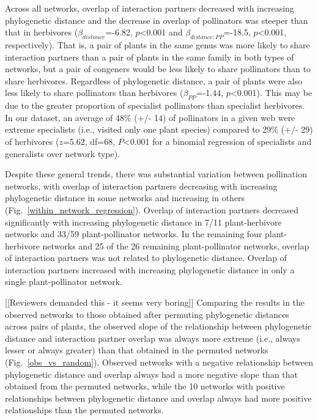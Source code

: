 \documentclass[12pt]{article}
\begin{document}
\begin{spacing}{1.5}
    Across all networks, overlap of interaction partners decreased with increasing phylogenetic distance and the decrease in overlap of pollinators was steeper than that in herbivores ($\beta_{distance}$=-6.82, $p$\textless0.001 and $\beta_{distance:PP}$=-18.5, $p$\textless0.001, respectively). That is, a pair of plants in the same genus was more likely to share interaction partners than a pair of plants in the same family in both types of networks, but a pair of congeners would be less likely to share pollinators than to share herbivores. Regardless of phylogenetic distance, a pair of plants were also less likely to share pollinators than herbivores ($\beta_{PP}$=-1.44, $p$\textless0.001). This may be due to the greater proportion of
    specialist pollinators than specialist herbivores. In our dataset, an
    average of 48\% (+/- 14) of pollinators in a given web were extreme 
    specialists (i.e., visited only one plant species) compared to 29\% 
    (+/- 29) of herbivores ($z$=5.62, df=68, $P$\textless0.001 
    for a binomial regression of specialists and generalists over network
    type). %
 

    Despite these general trends, there was substantial variation between 
    pollination networks, with overlap of interaction partners decreasing 
    with increasing phylogenetic distance in some networks and increasing in 
    others (Fig.~\ref{within_network_regression}). Overlap of interaction partners decreased significantly with increasing phylogenetic distance in 7/11 plant-herbivore networks and 33/59 plant-pollinator networks. In the remaining four plant-herbivore networks and 25 of the 26 remaining plant-pollinator networks, overlap of interaction partners was not related to phylogenetic distance. Overlap of interaction partners increased with increasing phylogenetic distance in only a single plant-pollinator network.%


    [[Reviewers demanded this - it seems very boring]]
    Comparing the results in the observed networks to those obtained after permuting phylogenetic distances across pairs of plants, the observed slope of the relationship between phylogenetic distance and interaction partner overlap was always more extreme (i.e., always lesser or always greater) than that obtained in the permuted networks (Fig.~\ref{obs_vs_random}). Observed networks with a negative relationship between phylogenetic distance and overlap always had a more negative slope than that obtained from the permuted networks, while the 10 networks with positive relationships between phylogenetic distance and overlap always had more positive relationships than the permuted networks.



\end{spacing}
\end{document}
